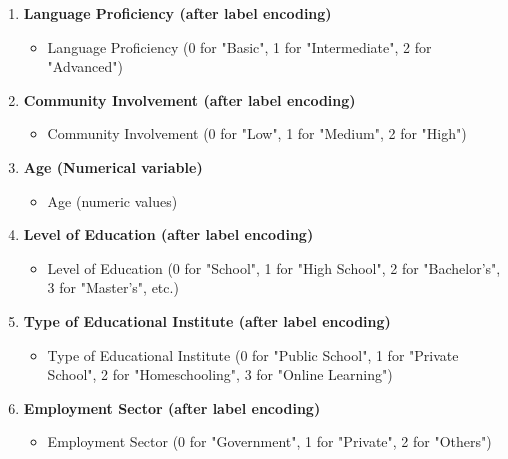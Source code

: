 \documentclass[final,12p,twocolumn]{article}
\begin{document}
\begin{enumerate}[itemsep=0pt, parsep=0pt, topsep=0pt, partopsep=0pt]
    \item \textbf{Language Proficiency (after label encoding)}  
\begin{itemize}[itemsep=0pt, parsep=0pt, topsep=0pt, partopsep=0pt]
  \item  Language Proficiency (0 for "Basic", 1 for "Intermediate", 2 for "Advanced") 
\end{itemize}
    \item \textbf{Community Involvement (after label encoding)}  
\begin{itemize}[itemsep=0pt, parsep=0pt, topsep=0pt, partopsep=0pt]
  \item Community Involvement (0 for "Low", 1 for "Medium", 2 for "High") 
\end{itemize}
    \item \textbf{Age (Numerical variable)}  
\begin{itemize}[itemsep=0pt, parsep=0pt, topsep=0pt, partopsep=0pt]
  \item Age (numeric values)  
\end{itemize}
    \item \textbf{Level of Education (after label encoding)}  
\begin{itemize}[itemsep=0pt, parsep=0pt, topsep=0pt, partopsep=0pt]
  \item Level of Education (0 for "School", 1 for "High School", 2 for "Bachelor’s", 3 for "Master’s", etc.) 
\end{itemize}
    \item \textbf{Type of Educational Institute (after label encoding)} 
\begin{itemize}[itemsep=0pt, parsep=0pt, topsep=0pt, partopsep=0pt]
  \item  Type of Educational Institute (0 for "Public School", 1 for "Private School", 2 for "Homeschooling", 3 for "Online Learning") 
\end{itemize}
\item \textbf{Employment Sector (after label encoding)} 
\begin{itemize}[itemsep=0pt, parsep=0pt, topsep=0pt, partopsep=0pt]
  \item  Employment Sector (0 for "Government", 1 for "Private", 2 for "Others") 
\end{itemize}
\end{enumerate}
\end{document}
